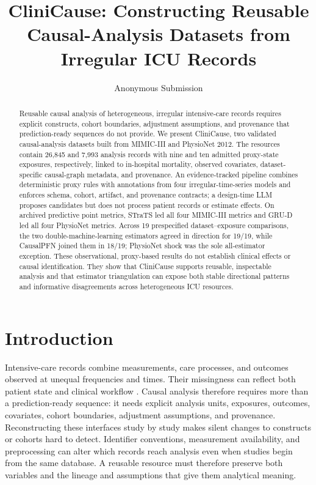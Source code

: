 \documentclass[letterpaper]{article}
\title{CliniCause: Constructing Reusable Causal-Analysis Datasets from Irregular ICU Records}
\author{Anonymous Submission}
\begin{document}
\maketitle

\begin{abstract}
Reusable causal analysis of heterogeneous, irregular intensive-care records
requires explicit constructs, cohort boundaries, adjustment assumptions, and
provenance that prediction-ready sequences do not provide. We present
CliniCause, two validated causal-analysis datasets built from MIMIC-III and
PhysioNet 2012. The resources contain 26,845 and 7,993 analysis records with
nine and ten admitted proxy-state exposures, respectively, linked to
in-hospital mortality, observed covariates, dataset-specific causal-graph
metadata, and provenance. An evidence-tracked pipeline combines deterministic
proxy rules with annotations from four irregular-time-series models and
enforces schema, cohort, artifact, and provenance contracts; a design-time LLM
proposes candidates but does not process patient records or estimate effects.
On archived predictive point metrics, STraTS led all four MIMIC-III metrics and
GRU-D led all four PhysioNet metrics. Across 19 prespecified dataset--exposure
comparisons, the two double-machine-learning estimators agreed in direction for
19/19, while CausalPFN joined them in 18/19; PhysioNet shock was the sole
all-estimator exception. These observational, proxy-based results do not
establish clinical effects or causal identification. They show that CliniCause
supports reusable, inspectable analysis and that estimator triangulation can
expose both stable directional patterns and informative disagreements across
heterogeneous ICU resources.
\end{abstract}

\section{Introduction}

Intensive-care records combine measurements, care processes, and outcomes
observed at unequal frequencies and times. Their missingness can reflect both
patient state and clinical workflow
\cite{sun_2026_review_irregular_medical_timeseries,
lipton_kale_wetzel_2016_missingness_rnns}. Causal analysis therefore requires
more than a prediction-ready sequence: it needs explicit analysis units,
exposures, outcomes, covariates, cohort boundaries, adjustment assumptions, and
provenance. Reconstructing these interfaces study by study makes silent changes
to constructs or cohorts hard to detect. Identifier conventions, measurement
availability, and preprocessing can alter which records reach analysis even
when studies begin from the same database. A reusable resource must therefore
preserve both variables and the lineage and assumptions that give them
analytical meaning.
\end{document}
